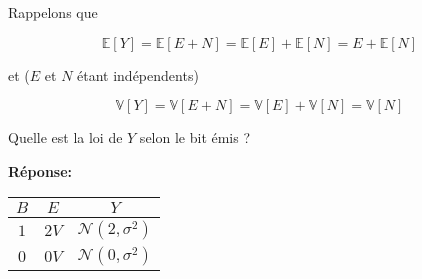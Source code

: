 \documentclass[11pt]{article}
\begin{document}
Rappelons que

\[\mathbb{E}[Y] = \mathbb{E}[E + N] = \mathbb{E}[E] + \mathbb{E}[N] = E + \mathbb{E}[N]\]

et (\(E\) et \(N\) étant indépendents)

\[\mathbb{V}[Y] = \mathbb{V}[E + N] = \mathbb{V}[E] + \mathbb{V}[N] = \mathbb{V}[N]\]

Quelle est la loi de \(Y\) selon le bit émis ?


\textbf{Réponse:}

\begin{longtable}[]{@{}ccc@{}}
\toprule
\(B\) & \(E\) & \(Y\)\tabularnewline
\midrule
\endhead
\(1\) & \(2 V\) & \(\mathcal{N}(2,\sigma^2)\)\tabularnewline
\(0\) & \(0 V\) & \(\mathcal{N}(0,\sigma^2)\)\tabularnewline
\bottomrule
\end{longtable}
\end{document}

